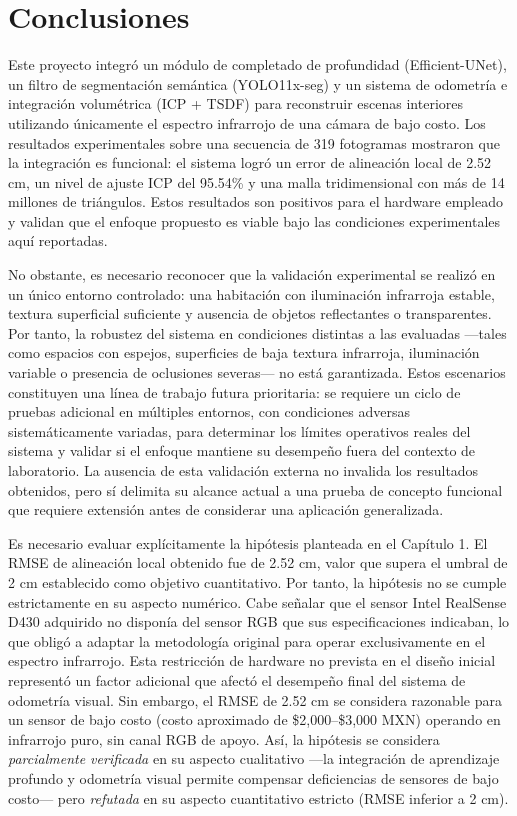 \documentclass[12pt, a4, twoside, openany]{report}
\begin{document}
\section{Conclusiones}

Este proyecto integró un módulo de completado de profundidad (Efficient-UNet), un filtro de segmentación semántica (YOLO11x-seg) y un sistema de odometría e integración volumétrica (ICP + TSDF) para reconstruir escenas interiores utilizando únicamente el espectro infrarrojo de una cámara de bajo costo. Los resultados experimentales sobre una secuencia de 319 fotogramas mostraron que la integración es funcional: el sistema logró un error de alineación local de 2.52 cm, un nivel de ajuste ICP del 95.54\% y una malla tridimensional con más de 14 millones de triángulos. Estos resultados son positivos para el hardware empleado y validan que el enfoque propuesto es viable bajo las condiciones experimentales aquí reportadas.

No obstante, es necesario reconocer que la validación experimental se realizó en un único entorno controlado: una habitación con iluminación infrarroja estable, textura superficial suficiente y ausencia de objetos reflectantes o transparentes. Por tanto, la robustez del sistema en condiciones distintas a las evaluadas ---tales como espacios con espejos, superficies de baja textura infrarroja, iluminación variable o presencia de oclusiones severas--- no está garantizada. Estos escenarios constituyen una línea de trabajo futura prioritaria: se requiere un ciclo de pruebas adicional en múltiples entornos, con condiciones adversas sistemáticamente variadas, para determinar los límites operativos reales del sistema y validar si el enfoque mantiene su desempeño fuera del contexto de laboratorio. La ausencia de esta validación externa no invalida los resultados obtenidos, pero sí delimita su alcance actual a una prueba de concepto funcional que requiere extensión antes de considerar una aplicación generalizada.

Es necesario evaluar explícitamente la hipótesis planteada en el Capítulo 1. El RMSE de alineación local obtenido fue de 2.52 cm, valor que supera el umbral de 2 cm establecido como objetivo cuantitativo. Por tanto, la hipótesis no se cumple estrictamente en su aspecto numérico. Cabe señalar que el sensor Intel RealSense D430 adquirido no disponía del sensor RGB que sus especificaciones indicaban, lo que obligó a adaptar la metodología original para operar exclusivamente en el espectro infrarrojo. Esta restricción de hardware no prevista en el diseño inicial representó un factor adicional que afectó el desempeño final del sistema de odometría visual. Sin embargo, el RMSE de 2.52 cm se considera razonable para un sensor de bajo costo (costo aproximado de \$2{,}000--\$3{,}000 MXN) operando en infrarrojo puro, sin canal RGB de apoyo. Así, la hipótesis se considera \textit{parcialmente verificada} en su aspecto cualitativo ---la integración de aprendizaje profundo y odometría visual permite compensar deficiencias de sensores de bajo costo--- pero \textit{refutada} en su aspecto cuantitativo estricto (RMSE inferior a 2 cm).
\end{document}
